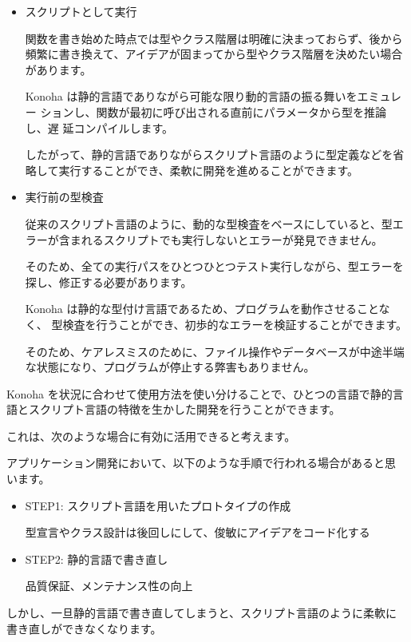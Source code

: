 \documentclass[mingoth,a4paper]{jsarticle}
\begin{document}
\begin{itemize}
\item スクリプトとして実行

関数を書き始めた時点では型やクラス階層は明確に決まっておらず、後から
頻繁に書き換えて、アイデアが固まってから型やクラス階層を決めたい場合
があります。

Konoha は静的言語でありながら可能な限り動的言語の振る舞いをエミュレー
ションし、関数が最初に呼び出される直前にパラメータから型を推論し、遅
延コンパイルします。

したがって、静的言語でありながらスクリプト言語のように型定義などを省
略して実行することができ、柔軟に開発を進めることができます。

\item 実行前の型検査

従来のスクリプト言語のように、動的な型検査をベースにしていると、型エ
ラーが含まれるスクリプトでも実行しないとエラーが発見できません。

そのため、全ての実行パスをひとつひとつテスト実行しながら、型エラーを
探し、修正する必要があります。

Konoha は静的な型付け言語であるため、プログラムを動作させることなく、
型検査を行うことができ、初歩的なエラーを検証することができます。

そのため、ケアレスミスのために、ファイル操作やデータベースが中途半端
な状態になり、プログラムが停止する弊害もありません。

\end{itemize}

Konoha を状況に合わせて使用方法を使い分けることで、ひとつの言語で静的言
語とスクリプト言語の特徴を生かした開発を行うことができます。

これは、次のような場合に有効に活用できると考えます。

アプリケーション開発において、以下のような手順で行われる場合があると思
います。

\begin{itemize}
\item STEP1: スクリプト言語を用いたプロトタイプの作成

型宣言やクラス設計は後回しにして、俊敏にアイデアをコード化する

\item STEP2: 静的言語で書き直し

品質保証、メンテナンス性の向上
\end{itemize}

しかし、一旦静的言語で書き直してしまうと、スクリプト言語のように柔軟に
書き直しができなくなります。
\end{document}
